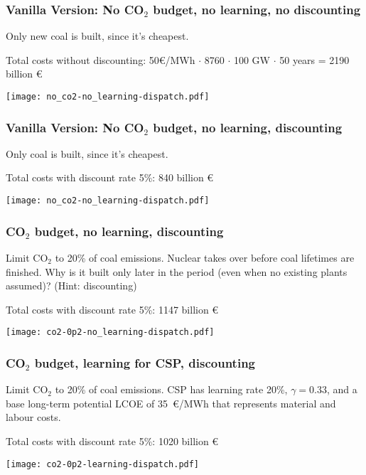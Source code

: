 \documentclass[10pt,aspectratio=169,dvipsnames]{beamer}
\begin{document}
\begin{frame}
  \frametitle{Vanilla Version: No CO$_2$ budget, no learning, no discounting}

  Only new coal is built, since it's cheapest.

  Total costs without discounting: 50\euro/MWh $\cdot$ 8760 $\cdot$ 100 GW $\cdot$ 50 years = 2190 billion \euro

    \centering
  \texttt{[image: no\_co2-no\_learning-dispatch.pdf]}
\end{frame}


\begin{frame}
  \frametitle{Vanilla Version: No CO$_2$ budget, no learning, discounting}

  Only coal is built, since it's cheapest.

  Total costs with discount rate 5\%: 840 billion \euro

   \centering
  \texttt{[image: no\_co2-no\_learning-dispatch.pdf]}

\end{frame}




\begin{frame}
  \frametitle{CO$_2$ budget, no learning, discounting}

  Limit CO$_2$ to 20\% of coal emissions. Nuclear takes over before coal lifetimes are finished. Why is it built only later in the period (even when no existing plants assumed)? (Hint: discounting)

  Total costs with discount rate 5\%: 1147 billion \euro

  \centering
  \texttt{[image: co2-0p2-no\_learning-dispatch.pdf]}

\end{frame}



\begin{frame}
  \frametitle{CO$_2$ budget, learning for CSP, discounting}


  Limit CO$_2$ to 20\% of coal emissions. CSP has learning rate 20\%, $\gamma = 0.33$, and a base long-term potential LCOE of 35~\euro/MWh that represents material and labour costs.

  Total costs with discount rate 5\%: 1020 billion \euro

  \centering
  \texttt{[image: co2-0p2-learning-dispatch.pdf]}

\end{frame}
\end{document}
